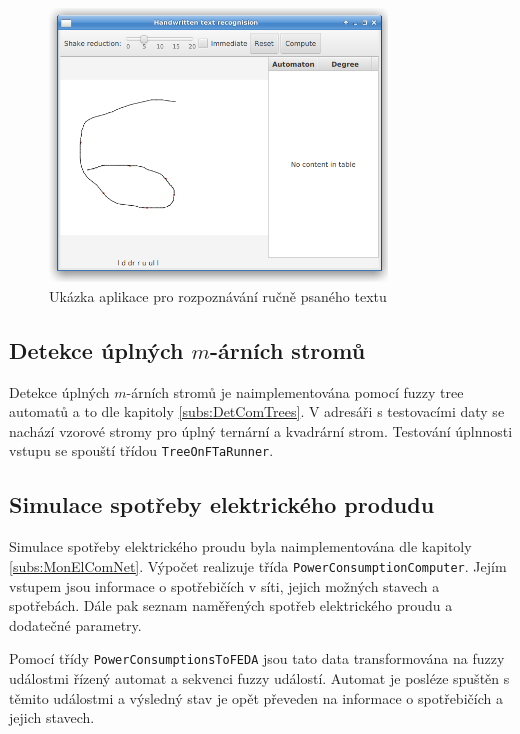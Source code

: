 \documentclass[a4paper,10pt]{article}
\begin{document}
\begin{figure}
 \centering
 \includegraphics[width=0.8\textwidth]{handwritrec-screen}
 \caption{Ukázka aplikace pro rozpoznávání ručně psaného textu} \label{img:HandWritScreen}
\end{figure}


\subsection{Detekce úplných $m$-árních stromů}
Detekce úplných $m$-árních stromů je naimplementována pomocí fuzzy tree automatů a to dle kapitoly \ref{subs:DetComTrees}. V adresáři s testovacími daty se nachází vzorové stromy pro úplný ternární a kvadrární strom. Testování úplnnosti vstupu se spouští třídou \verb|TreeOnFTaRunner|.

\subsection{Simulace spotřeby elektrického produdu}
Simulace spotřeby elektrického proudu byla naimplementována dle kapitoly \ref{subs:MonElComNet}. Výpočet realizuje třída \verb|PowerConsumptionComputer|. Jejím vstupem jsou informace o spotřebičích v síti, jejich možných stavech a spotřebách. Dále pak seznam naměřených spotřeb elektrického proudu a dodatečné parametry. 

Pomocí třídy \verb|PowerConsumptionsToFEDA| jsou tato data transformována na fuzzy událostmi řízený automat a sekvenci fuzzy událostí. Automat je posléze spuštěn s těmito událostmi a výsledný stav je opět převeden na informace o spotřebičích a jejich stavech. 
\end{document}
